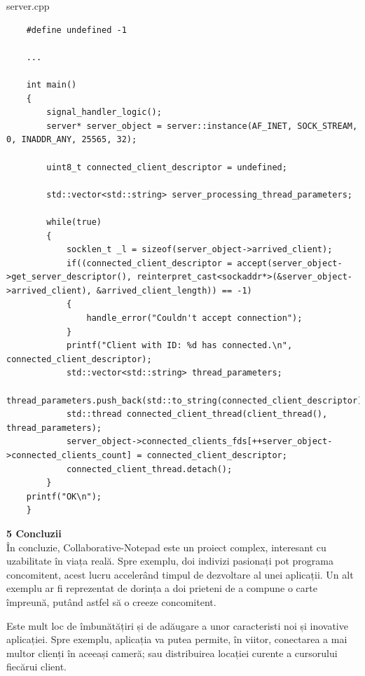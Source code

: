 \documentclass[runningheads]{llncs}
\begin{document}
{\large server.cpp}
\begin{tiny}
\begin{lstlisting}
    #define undefined -1

    ...

    int main()
    {
        signal_handler_logic();
        server* server_object = server::instance(AF_INET, SOCK_STREAM, 0, INADDR_ANY, 25565, 32);

        uint8_t connected_client_descriptor = undefined;

        std::vector<std::string> server_processing_thread_parameters;

        while(true)
        {
            socklen_t _l = sizeof(server_object->arrived_client);
            if((connected_client_descriptor = accept(server_object->get_server_descriptor(), reinterpret_cast<sockaddr*>(&server_object->arrived_client), &arrived_client_length)) == -1)
            {
                handle_error("Couldn't accept connection");
            }
            printf("Client with ID: %d has connected.\n", connected_client_descriptor);
            std::vector<std::string> thread_parameters;
            thread_parameters.push_back(std::to_string(connected_client_descriptor));
            std::thread connected_client_thread(client_thread(), thread_parameters);
            server_object->connected_clients_fds[++server_object->connected_clients_count] = connected_client_descriptor;
            connected_client_thread.detach();
        }
    printf("OK\n");
    }
\end{lstlisting}
\end{tiny}
\newpage

{\Large \bf 5 Concluzii}
\\

În concluzie, Collaborative-Notepad este un proiect complex, interesant cu uzabilitate în viața reală. Spre exemplu, doi indivizi pasionați
pot programa concomitent, acest lucru accelerând timpul de dezvoltare al unei aplicații. Un alt exemplu ar fi reprezentat de dorința a doi prieteni
de a compune o carte împreună, putând astfel să o creeze concomitent.

Este mult loc de îmbunătățiri și de adăugare a unor caracteristi noi și inovative aplicației. Spre exemplu, aplicația va putea permite, în viitor,
conectarea a mai multor clienți în aceeași cameră; sau distribuirea locației curente a cursorului fiecărui client.
\\
\end{document}
